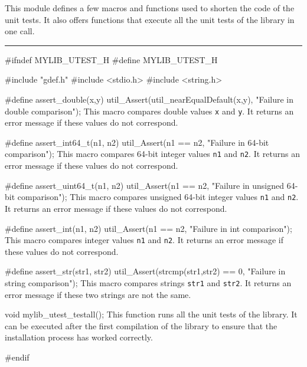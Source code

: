 
This module defines a few macros and functions used to shorten the code of the unit tests.
It also offers functions that execute all the unit tests of the library in one call.

\bigskip
\hrule
\code
\hide
#ifndef MYLIB_UTEST_H
#define MYLIB_UTEST_H
\endhide

#include "gdef.h"
#include <stdio.h>
#include <string.h>

#define assert_double(x,y) util_Assert(util_nearEqualDefault(x,y), "Failure in double comparison");
\endcode
 \tab  This macro compares double values {\tt x} and {\tt y}.
  It returns an error message if these values do not correspond.
 \endtab
\code

#define assert_int64_t(n1, n2) util_Assert(n1 == n2, "Failure in 64-bit comparison");
\endcode
 \tab  This macro compares 64-bit integer values {\tt n1} and {\tt n2}.
  It returns an error message if these values do not correspond.
 \endtab
\code

#define assert_uint64_t(n1, n2) util_Assert(n1 == n2, "Failure in unsigned 64-bit comparison");
\endcode
 \tab  This macro compares unsigned 64-bit integer values {\tt n1} and {\tt n2}.
  It returns an error message if these values do not correspond.
 \endtab
\code

#define assert_int(n1, n2) util_Assert(n1 == n2, "Failure in int comparison");
\endcode
 \tab  This macro compares integer values {\tt n1} and {\tt n2}.
  It returns an error message if these values do not correspond.
 \endtab
\code

#define assert_str(str1, str2) util_Assert(strcmp(str1,str2) == 0, "Failure in string comparison");
\endcode
 \tab  This macro compares strings {\tt str1} and {\tt str2}.
  It returns an error message if these two strings are not the same.
 \endtab
\code

void mylib_utest_testall();
\endcode
 \tab  This function runs all the unit tests of the library. 
  It can be executed after the first compilation of the library to ensure that the installation 
	process has worked correctly.
 \endtab
\code

\hide
#endif
\endhide
\endcode
